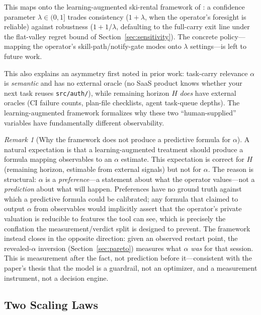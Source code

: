 \documentclass[11pt]{article}
\theoremstyle{definition}
\theoremstyle{remark}
\newtheorem{remark}[theorem]{Remark}
\begin{document}
This maps onto the learning-augmented ski-rental framework of \citet{purohit2018}: a confidence parameter $\lambda \in (0,1]$ trades consistency ($1+\lambda$, when the operator's foresight is reliable) against robustness ($1+1/\lambda$, defaulting to the full-carry exit line under the flat-valley regret bound of Section~\ref{sec:sensitivity}). The concrete policy---mapping the operator's skill-path/notify-gate modes onto $\lambda$ settings---is left to future work.

This also explains an asymmetry first noted in prior work: task-carry relevance $\alpha$ is \emph{semantic} and has no external oracle (no SaaS product knows whether your next task reuses \texttt{src/auth/}), while remaining horizon $H$ \emph{does} have external oracles (CI failure counts, plan-file checklists, agent task-queue depths). The learning-augmented framework formalizes why these two ``human-supplied'' variables have fundamentally different observability.

\begin{remark}[Why the framework does not produce a predictive formula for $\alpha$]
A natural expectation is that a learning-augmented treatment should produce a formula mapping observables to an $\alpha$ estimate. This expectation is correct for $H$ (remaining horizon, estimable from external signals) but not for $\alpha$. The reason is structural: $\alpha$ is a \emph{preference}---a statement about what the operator values---not a \emph{prediction} about what will happen. Preferences have no ground truth against which a predictive formula could be calibrated; any formula that claimed to output $\alpha$ from observables would implicitly assert that the operator's private valuation is reducible to features the tool can see, which is precisely the conflation the measurement/verdict split is designed to prevent. The framework instead closes in the opposite direction: given an observed restart point, the revealed-$\alpha$ inversion (Section~\ref{sec:pareto}) measures what $\alpha$ \emph{was} for that session. This is measurement after the fact, not prediction before it---consistent with the paper's thesis that the model is a guardrail, not an optimizer, and a measurement instrument, not a decision engine.
\end{remark}

\subsection{Two Scaling Laws}
\label{sec:twolaws}
\end{document}
